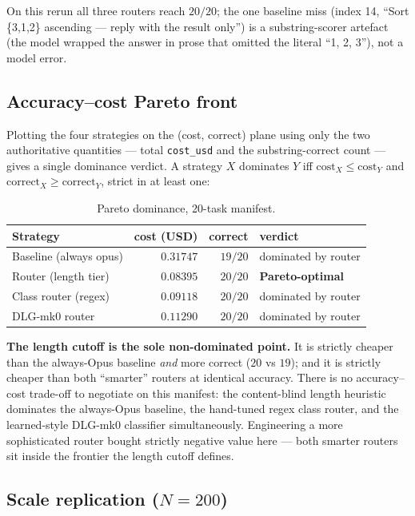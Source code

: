 \documentclass[11pt,a4paper]{article}
\begin{document}
On this rerun all three routers reach $20/20$; the one baseline miss
(index 14, ``Sort \{3,1,2\} ascending --- reply with the result
only'') is a substring-scorer artefact (the model wrapped the answer
in prose that omitted the literal ``1, 2, 3''), not a model error.

\subsection{Accuracy--cost Pareto front}
\label{sec:pareto}

Plotting the four strategies on the (cost, correct) plane using only
the two authoritative quantities --- total \texttt{cost\_usd} and the
substring-correct count --- gives a single dominance verdict. A
strategy $X$ dominates $Y$ iff $\text{cost}_X \le \text{cost}_Y$ and
$\text{correct}_X \ge \text{correct}_Y$, strict in at least one:

\begin{table}[h]
\centering
\caption{Pareto dominance, 20-task manifest.}
\label{tab:pareto}
\begin{tabular}{lrrl}
\toprule
\textbf{Strategy} & \textbf{cost (USD)} & \textbf{correct} & \textbf{verdict} \\
\midrule
Baseline (always opus) & $0.31747$ & $19/20$ & dominated by router \\
Router (length tier)    & $0.08395$ & $20/20$ & \textbf{Pareto-optimal} \\
Class router (regex)    & $0.09118$ & $20/20$ & dominated by router \\
DLG-mk0 router          & $0.11290$ & $20/20$ & dominated by router \\
\bottomrule
\end{tabular}
\end{table}

\textbf{The length cutoff is the sole non-dominated point.} It is
strictly cheaper than the always-Opus baseline \emph{and} more correct
($20$ vs $19$); and it is strictly cheaper than both ``smarter''
routers at identical accuracy. There is no accuracy--cost trade-off to
negotiate on this manifest: the content-blind length heuristic
dominates the always-Opus baseline, the hand-tuned regex class router,
and the learned-style DLG-mk0 classifier simultaneously. Engineering a
more sophisticated router bought strictly negative value here --- both
smarter routers sit inside the frontier the length cutoff defines.

\subsection{Scale replication ($N = 200$)}
\label{sec:scale}
\end{document}

